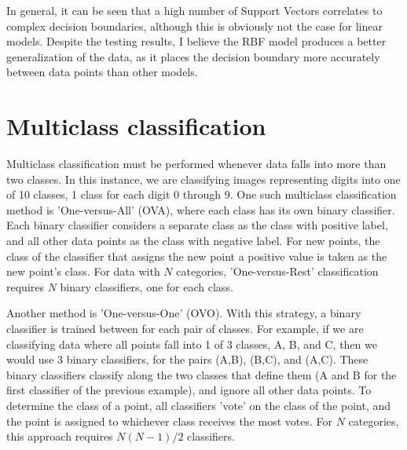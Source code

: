 \documentclass[a4paper]{article}
\begin{document}
In general, it can be seen that a high number of Support Vectors correlates to complex decision boundaries, although this is obviously not the case for linear models.  Despite the testing results, I believe the RBF model produces a better generalization of the data, as it places the decision boundary more accurately between data points than other models.
\clearpage

\section{Multiclass classification}

Multiclass classification must be performed whenever data falls into more than two classes.  In this instance, we are classifying images representing digits into one of 10 classes, 1 class for each digit 0 through 9.  One such multiclass classification method is 'One-versus-All' (OVA), where each class has its own binary classifier.  Each binary classifier considers a separate class as the class with positive label, and all other data points as the class with negative label.  For new points, the class of the classifier that assigns the new point a positive value is taken as the new point's class.  For data with $N$ categories, 'One-versus-Rest' classification requires $N$ binary classifiers, one for each class.

Another method is 'One-versus-One' (OVO).  With this strategy, a binary classifier is trained between for each pair of classes.  For example, if we are classifying data where all points fall into 1 of 3 classes, A, B, and C, then we would use 3 binary classifiers, for the pairs (A,B), (B,C), and (A,C).  These binary classifiers classify along the two classes that define them (A and B for the first classifier of the previous example), and ignore all other data points.  To determine the class of a point, all classifiers 'vote' on the class of the point, and the point is assigned to whichever class receives the most votes.  For $N$ categories, this approach requires $N(N-1)/2$ classifiers.
\end{document}
